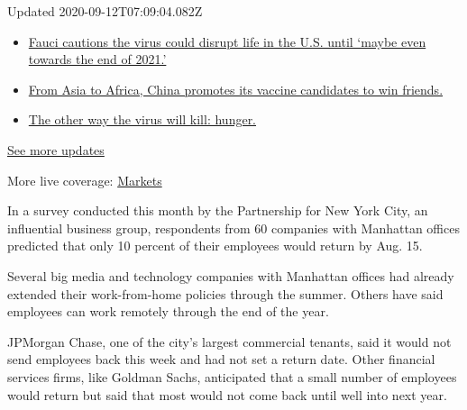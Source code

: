 Updated 2020-09-12T07:09:04.082Z

\begin{itemize}
\tightlist
\item
  \href{https://www.nytimes3xbfgragh.onion/2020/09/11/world/covid-19-coronavirus.html?action=click\&pgtype=Article\&state=default\&region=MAIN_CONTENT_1\&context=storylines_live_updates\#link-dfb8a16}{Fauci
  cautions the virus could disrupt life in the U.S. until `maybe even
  towards the end of 2021.'}
\item
  \href{https://www.nytimes3xbfgragh.onion/2020/09/11/world/covid-19-coronavirus.html?action=click\&pgtype=Article\&state=default\&region=MAIN_CONTENT_1\&context=storylines_live_updates\#link-7104d154}{From
  Asia to Africa, China promotes its vaccine candidates to win friends.}
\item
  \href{https://www.nytimes3xbfgragh.onion/2020/09/11/world/covid-19-coronavirus.html?action=click\&pgtype=Article\&state=default\&region=MAIN_CONTENT_1\&context=storylines_live_updates\#link-393ad215}{The
  other way the virus will kill: hunger.}
\end{itemize}

\href{https://www.nytimes3xbfgragh.onion/2020/09/11/world/covid-19-coronavirus.html?action=click\&pgtype=Article\&state=default\&region=MAIN_CONTENT_1\&context=storylines_live_updates}{See
more updates}

More live coverage:
\href{https://www.nytimes3xbfgragh.onion/live/2020/09/11/business/stock-market-today-coronavirus?action=click\&pgtype=Article\&state=default\&region=MAIN_CONTENT_1\&context=storylines_live_updates}{Markets}

In a survey conducted this month by the Partnership for New York City,
an influential business group, respondents from 60 companies with
Manhattan offices predicted that only 10 percent of their employees
would return by Aug. 15.

Several big media and technology companies with Manhattan offices had
already extended their work-from-home policies through the summer.
Others have said employees can work remotely through the end of the
year.

JPMorgan Chase, one of the city's largest commercial tenants, said it
would not send employees back this week and had not set a return date.
Other financial services firms, like Goldman Sachs, anticipated that a
small number of employees would return but said that most would not come
back until well into next year.

